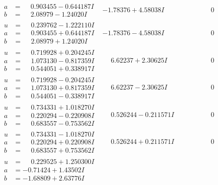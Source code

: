 \documentclass[1p]{elsarticle_modified}
\theoremstyle{definition}
\begin{document}
$$\begin{array}{c|c|c}
\begin{aligned}
a &= \phantom{-}0.903455 - 0.644187 I \\
b &= \phantom{-}2.08979 - 1.24020 I\end{aligned}
 & -1.78376 + 4.58038 I & \phantom{-0.000000 } 0 \\ \hline\begin{aligned}
u &= \phantom{-}0.239762 - 1.222110 I \\
a &= \phantom{-}0.903455 + 0.644187 I \\
b &= \phantom{-}2.08979 + 1.24020 I\end{aligned}
 & -1.78376 - 4.58038 I & \phantom{-0.000000 } 0 \\ \hline\begin{aligned}
u &= \phantom{-}0.719928 + 0.204245 I \\
a &= \phantom{-}1.073130 - 0.817359 I \\
b &= \phantom{-}0.544051 + 0.338917 I\end{aligned}
 & \phantom{-}6.62237 + 2.30625 I & \phantom{-0.000000 } 0 \\ \hline\begin{aligned}
u &= \phantom{-}0.719928 - 0.204245 I \\
a &= \phantom{-}1.073130 + 0.817359 I \\
b &= \phantom{-}0.544051 - 0.338917 I\end{aligned}
 & \phantom{-}6.62237 - 2.30625 I & \phantom{-0.000000 } 0 \\ \hline\begin{aligned}
u &= \phantom{-}0.734331 + 1.018270 I \\
a &= \phantom{-}0.220294 - 0.220908 I \\
b &= \phantom{-}0.683557 - 0.753562 I\end{aligned}
 & \phantom{-}0.526244 - 0.211571 I & \phantom{-0.000000 } 0 \\ \hline\begin{aligned}
u &= \phantom{-}0.734331 - 1.018270 I \\
a &= \phantom{-}0.220294 + 0.220908 I \\
b &= \phantom{-}0.683557 + 0.753562 I\end{aligned}
 & \phantom{-}0.526244 + 0.211571 I & \phantom{-0.000000 } 0 \\ \hline\begin{aligned}
u &= \phantom{-}0.229525 + 1.250300 I \\
a &= -0.71424 + 1.43502 I \\
b &= -1.68809 + 2.63776 I\end{aligned}

\end{array}$$
\end{document}
